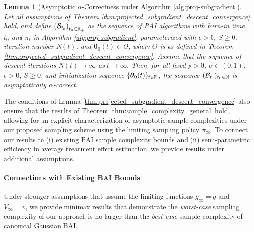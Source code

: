 \documentclass{article}
\newtheorem{lemma}{Lemma}
\begin{document}
\begin{lemma}[Asymptotic $\alpha$-Correctness under Algorithm \ref{alg:proj-subgradient}]\label{thm:results_general}
    Let all assumptions of Theorem \ref{thm:projected_subgradient_descent_convergence} hold, and define $\left(\mathcal{B}_{t_0}\right)_{t_0 \in \mathbb{R}_+}$ as the sequence of BAI algorithms with burn-in time $t_0$ and $\pi_t$ in Algorithm \ref{alg:proj-subgradient}, parameterized with $\epsilon > 0$, $S \geq 0$, iteration number $N(t)$, and $\bm\theta_0(t) \in \Theta$, where $\Theta$ is as defined in Theorem \ref{thm:projected_subgradient_descent_convergence}. Assume that the sequence of descent iterations $N(t) \rightarrow \infty$ as $t \rightarrow \infty$. Then, for all fixed $\rho > 0$, $\alpha \in (0,1)$, $\epsilon > 0$, $S \geq 0$, and initialization sequence $\{\boldsymbol{\theta}_0(t)\}_{t \in \mathbb{N}}$, the sequence $(\mathcal{B}_{t_0})_{t_0 \in \mathbb{N}}$ is asymptotically $\alpha$-correct.
\end{lemma}

The conditions of Lemma \ref{thm:projected_subgradient_descent_convergence} also ensure that the results of Theorem \ref{thm:sample_complexity_general} hold, allowing for an explicit characterization of asymptotic sample complexities under our proposed sampling scheme using the limiting sampling policy $\pi_\infty$. To connect our results to (i) existing BAI sample complexity bounds and (ii) semi-parametric efficiency in average treatment effect estimation, we provide results under additional assumptions. 

\paragraph{Connections with Existing BAI Bounds}





Under stronger assumptions that assume the limiting functions $g_\infty = g$ and $V_\infty = v$, we provide minimax results that demonstrate the \textit{worst-case} sampling complexity of our approach is no larger than the \textit{best-case} sample complexity of canonical Gaussian BAI.
\end{document}
